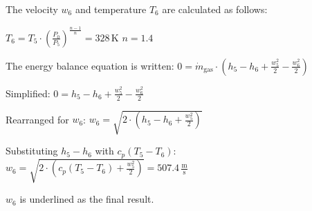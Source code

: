 The velocity \( w_6 \) and temperature \( T_6 \) are calculated as follows:  

\( T_6 = T_5 \cdot \left( \frac{P_0}{P_5} \right)^{\frac{n-1}{n}} = 328 \, \text{K} \)  
\( n = 1.4 \)  

The energy balance equation is written:  
\( 0 = \dot{m}_{\text{gas}} \cdot \left( h_5 - h_6 + \frac{w_5^2}{2} - \frac{w_6^2}{2} \right) \)  

Simplified:  
\( 0 = h_5 - h_6 + \frac{w_5^2}{2} - \frac{w_6^2}{2} \)  

Rearranged for \( w_6 \):  
\( w_6 = \sqrt{2 \cdot \left( h_5 - h_6 + \frac{w_5^2}{2} \right)} \)  

Substituting \( h_5 - h_6 \) with \( c_p (T_5 - T_6) \):  
\( w_6 = \sqrt{2 \cdot \left( c_p (T_5 - T_6) + \frac{w_5^2}{2} \right)} = 507.4 \, \frac{\text{m}}{\text{s}} \)  

\( w_6 \) is underlined as the final result.